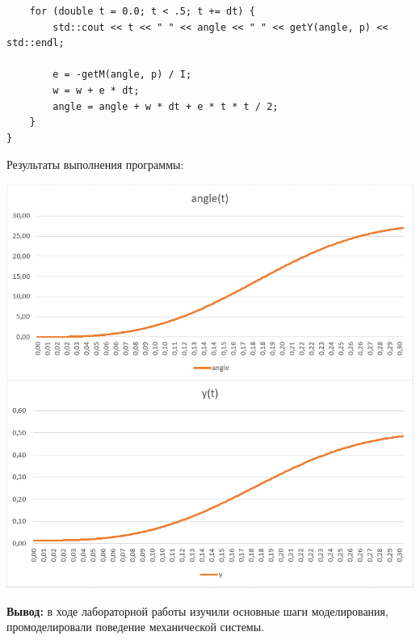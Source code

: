 \documentclass[a4paper,14pt]{extarticle}
\begin{document}
\begin{enumerate}[1. ]
\begin{verbatim}
    for (double t = 0.0; t < .5; t += dt) {
        std::cout << t << " " << angle << " " << getY(angle, p) << std::endl;

        e = -getM(angle, p) / I;
        w = w + e * dt;
        angle = angle + w * dt + e * t * t / 2;
    }
}
    \end{verbatim}
          Результаты выполнения программы:

          \begin{center}
            \includegraphics[width=140mm]{graphs.png}
          \end{center}

\end{enumerate}

\textbf{Вывод: } в ходе лабораторной работы изучили основные шаги моделирования,
промоделировали поведение механической системы.
\end{document}
